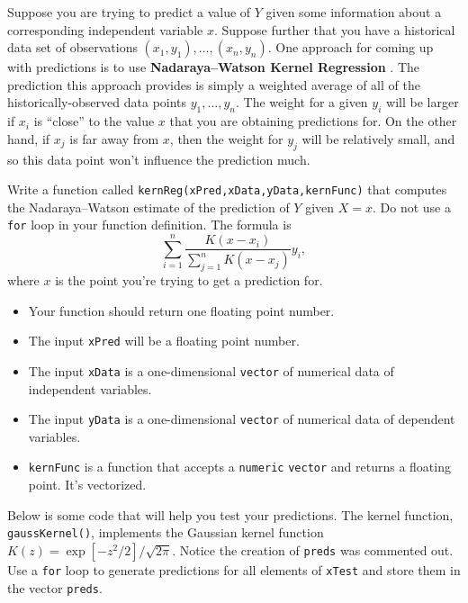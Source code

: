 \documentclass[
  12pt,
  krantz2]{krantz}
\providecommand{\tightlist}{%
  \setlength{\itemsep}{0pt}\setlength{\parskip}{0pt}}
\begin{document}
Suppose you are trying to predict a value of \(Y\) given some information about a corresponding independent variable \(x\). Suppose further that you have a historical data set of observations \((x_1, y_1), \ldots, (x_n,y_n)\). One approach for coming up with predictions is to use \textbf{Nadaraya--Watson Kernel Regression} \citep{Nadaraya} \citep{Watson}. The prediction this approach provides is simply a weighted average of all of the historically-observed data points \(y_1, \ldots, y_n\). The weight for a given \(y_i\) will be larger if \(x_i\) is ``close'' to the value \(x\) that you are obtaining predictions for. On the other hand, if \(x_j\) is far away from \(x\), then the weight for \(y_j\) will be relatively small, and so this data point won't influence the prediction much.

Write a function called \texttt{kernReg(xPred,xData,yData,kernFunc)} that computes the Nadaraya--Watson estimate of the prediction of \(Y\) given \(X=x\). Do not use a \texttt{for} loop in your function definition. The formula is
\begin{equation} 
\sum_{i=1}^n \frac{K(x-x_i)}{\sum_{j=1}^n K(x-x_j) } y_i,
\end{equation}
where \(x\) is the point you're trying to get a prediction for.

\begin{itemize}
\tightlist
\item
  Your function should return one floating point number.
\item
  The input \texttt{xPred} will be a floating point number.
\item
  The input \texttt{xData} is a one-dimensional \texttt{vector} of numerical data of independent variables.
\item
  The input \texttt{yData} is a one-dimensional \texttt{vector} of numerical data of dependent variables.
\item
  \texttt{kernFunc} is a function that accepts a \texttt{numeric} \texttt{vector} and returns a floating point. It's vectorized.
\end{itemize}

Below is some code that will help you test your predictions. The kernel function, \texttt{gaussKernel()}, implements the Gaussian kernel function \(K(z) = \exp[-z^2/2]/\sqrt{2\pi}\). Notice the creation of \texttt{preds} was commented out. Use a \texttt{for} loop to generate predictions for all elements of \texttt{xTest} and store them in the vector \texttt{preds}.
\end{document}

